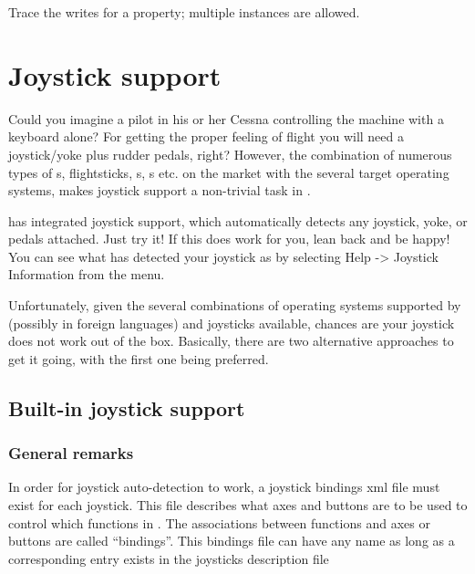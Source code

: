 {\begin{itemize}
Trace the writes for a property; multiple instances are allowed.
\end{itemize}



\section{Joystick support\label{joysticksupp}}
Could you imagine a pilot in his or her Cessna controlling the machine with
a keyboard alone? For getting the proper feeling of flight you will need a
joystick/yoke plus rudder pedals, right? However, the combination of
numerous types of s, flightsticks, s,
s etc. on the market with the several target operating systems,
makes joystick support a non-trivial task in \FlightGear{}.

\FlightGear{} has integrated joystick support, which automatically detects
any joystick, yoke, or pedals attached. Just try it! If this does work for
you, lean back and be happy! You can see what \FlightGear{} has detected your
joystick as by selecting Help -> Joystick Information from the menu.

Unfortunately, given the several combinations of operating systems supported
by \FlightGear{} (possibly in foreign languages) and joysticks available,
chances are your joystick does not work out of the box. Basically, there are
two alternative approaches to get it going, with the first one being
preferred.


\subsection{Built-in joystick support\label{joystickbuiltin}}

\subsubsection{General remarks\label{generalremarks}}
In order for joystick auto-detection to work, a joystick bindings xml file
must exist for each joystick. This file describes what axes and buttons are
to be used to control which functions in \FlightGear{}.  The associations
between functions and axes or buttons are called ``bindings''.  This
bindings file can have any name as long as a corresponding entry exists in
the joysticks description file
\medskip

}
